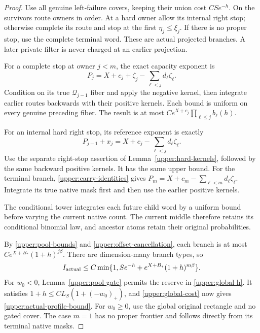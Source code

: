\begin{proof}
Use all genuine left-failure covers, keeping their union cost
$CS e^{-h}$.  On the survivors route owners in order.  At a hard owner
allow its internal right stop; otherwise complete its route and stop
at the first $\eta_j\leq\xi_j$.  If there is no proper stop, use the
complete terminal word.  These are actual projected branches.  A
later private filter is never charged at an earlier projection.

For a complete stop at owner $j<m$, the exact capacity exponent is
\begin{equation}
 P_j=X+c_j+\zeta_j-\sum_{\ell<j}d_\ell\zeta_\ell.
 \label{upper:stop-exponent}
\end{equation}
Condition on its true $\mathcal Q_{j-1}$ fiber and apply the negative
kernel, then integrate earlier routes backwards with their positive
kernels.  Each bound is uniform on every genuine preceding fiber.
The result is at most
$Ce^{X+c_j}\prod_{\ell\leq j}b_\ell(h)$.

For an internal hard right stop, its reference exponent is exactly
\[
 P_{j-1}+x_j=X+c_j-\sum_{\ell<j}d_\ell\zeta_\ell.
\]
Use the separate right-stop assertion of
Lemma~\ref{upper:hard-kernels}, followed by the same backward positive
kernels.  It has the same upper bound.  For the terminal branch,
\eqref{upper:carry-identities} gives
$P_m=X+c_m-\sum_{\ell<m}d_\ell\zeta_\ell$.  Integrate its true
native mask first and then use the earlier positive kernels.

The conditional tower integrates each future child word by a uniform
bound before varying the current native count.  The current middle
therefore retains its conditional binomial law, and ancestor atoms
retain their original probabilities.

By \eqref{upper:pool-bounds} and
\eqref{upper:offset-cancellation}, each branch is at most
$Ce^{X+B_*}(1+h)^{j\beta}$.  There are dimension-many branch types,
so
\begin{equation}
 I_{\rm actual}\leq C\min\{1,
          Se^{-h}+e^{X+B_*}(1+h)^{m\beta}\}.
 \label{upper:pre-profile}
\end{equation}
For $w_0<0$, Lemma~\ref{upper:pool-gate} permits the reserve in
\eqref{upper:global-h}.  It satisfies
$1+h\leq C L_S(1+(-w_0)_+)$, and
\eqref{upper:global-cost} now gives
\eqref{upper:actual-profile-bound}.  For $w_0\geq0$, use the global
original rectangle and no gated cover.  The case $m=1$ has no proper
frontier and follows directly from its terminal native masks.
\end{proof}

